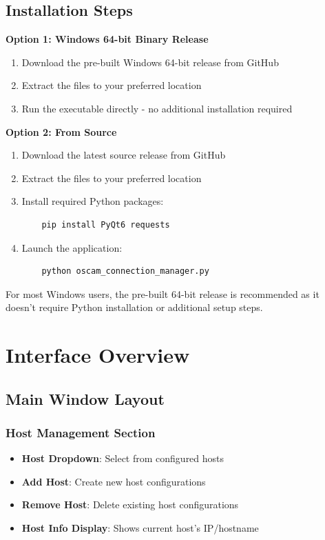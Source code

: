 \documentclass[a4paper,11pt]{report}
\begin{document}
\section{Installation Steps}
\begin{procedurebox}
\textbf{Option 1: Windows 64-bit Binary Release}
\begin{enumerate}
    \item Download the pre-built Windows 64-bit release from GitHub
    \item Extract the files to your preferred location
    \item Run the executable directly - no additional installation required
\end{enumerate}

\textbf{Option 2: From Source}
\begin{enumerate}
    \item Download the latest source release from GitHub
    \item Extract the files to your preferred location
    \item Install required Python packages:
    \begin{verbatim}
    pip install PyQt6 requests
    \end{verbatim}
    \item Launch the application:
    \begin{verbatim}
    python oscam_connection_manager.py
    \end{verbatim}
\end{enumerate}
\end{procedurebox}

\begin{tipbox}
For most Windows users, the pre-built 64-bit release is recommended as it doesn't require Python installation or additional setup steps.
\end{tipbox}

\chapter{Interface Overview}

\section{Main Window Layout}

\subsection{Host Management Section}
\begin{itemize}
    \item \textbf{Host Dropdown}: Select from configured hosts
    \item \textbf{Add Host}: Create new host configurations
    \item \textbf{Remove Host}: Delete existing host configurations
    \item \textbf{Host Info Display}: Shows current host's IP/hostname
\end{itemize}
\end{document}
